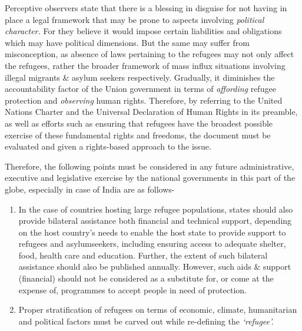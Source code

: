 \begin{multicols}{2}
\vspace{-.15cm}

\noi
Perceptive observers state that there is a blessing in disguise for not having in place a legal
framework that may be prone to aspects involving \textit{political character.} For they believe it
would impose certain liabilities and obligations which may have political dimensions. But the
same may suffer from misconception, as absence of laws pertaining to the refugees may not
only affect the refugees, rather the broader framework of mass influx situations involving
illegal migrants \& asylum seekers respectively. Gradually, it diminishes the accountability
factor of the Union government in terms of \textit{affording} refugee protection and \textit{observing} human rights. Therefore, by referring to the United Nations Charter and the Universal Declaration of
Human Rights in its preamble, as well as efforts such as ensuring that refugees have the
broadest possible exercise of these fundamental rights and freedoms, the document must be
evaluated and given a rights-based approach to the issue.

\vspace{-.2cm}


\vspace{-.15cm}

\noi
Therefore, the following points must be considered in any future administrative, executive
and legislative exercise by the national governments in this part of the globe, especially in
case of India are as follows-

\vspace{-.2cm}

\begin{enumerate}[label=$\bullet$]
\item In the case of countries hosting large refugee populations, states should also provide
bilateral assistance both financial and technical support, depending on the host
country’s needs to enable the host state to provide support to refugees and asylumseekers, including ensuring access to adequate shelter, food, health care and education.
Further, the extent of such bilateral assistance should also be published annually.
However, such aids \& support (financial) should not be considered as a substitute for,
or come at the expense of, programmes to accept people in need of protection.

\item Proper stratification of refugees on terms of economic, climate, humanitarian and
political factors must be carved out while re-defining the \textit{‘refugee’.}


\end{enumerate}
\end{multicols}

